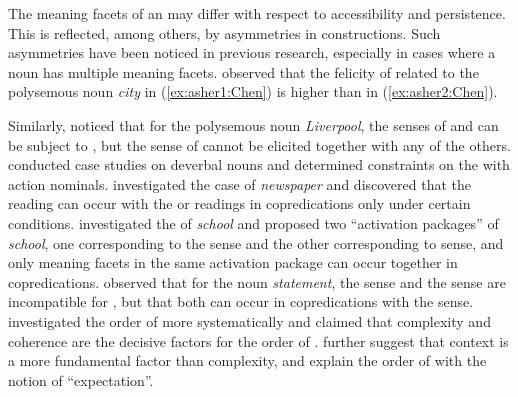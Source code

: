 \documentclass[output=paper,colorlinks,citecolor=brown,chinesefont]{langscibook}
\begin{document}
The meaning facets of an  may differ with respect to accessibility and persistence.
This is reflected, among others, by asymmetries in  constructions.
Such asymmetries have been noticed in previous research, especially in cases where a noun has multiple meaning facets. \citet[63]{asher2011lexical} observed that the felicity of  related to the polysemous noun \emph{city} in (\ref{ex:asher1:Chen}) is higher than in (\ref{ex:asher2:Chen}).
\ea \label{ex:asher2011:Chen}
 \label{ex:asher1:Chen}
 \label{ex:asher2:Chen}
\z\z

Similarly, \citet{Retore:14} noticed that for the polysemous noun \emph{Liverpool}, the senses of  and  can be subject to , but the sense of  cannot be elicited together with any of the others. \citet{jezek2011nominals} conducted case studies on deverbal nouns and determined constraints on the  with action nominals. \citet{chatzikyriakidis2015individuation} investigated the case of \emph{newspaper} and discovered that the  reading can occur with the  or  readings in copredications only under certain conditions. \citet{ortega2019polysemy} investigated the  of \emph{school} and proposed two ``activation packages'' of \emph{school}, one corresponding to the  sense and the other corresponding to  sense, and only meaning facets in the same activation package can occur together in copredications.
\citet{sutton2022restrictions} observed that for the noun \emph{statement}, the  sense and the  sense are incompatible for , but that both can occur in copredications with the  sense. \citet{murphy2021predicate} investigated the order of  more systematically and claimed that complexity and coherence are the decisive factors for the order of . \citet{michel2024cognitive} further suggest that context is a more fundamental factor than complexity, and explain the order of  with the notion of ``expectation''.
\end{document}
